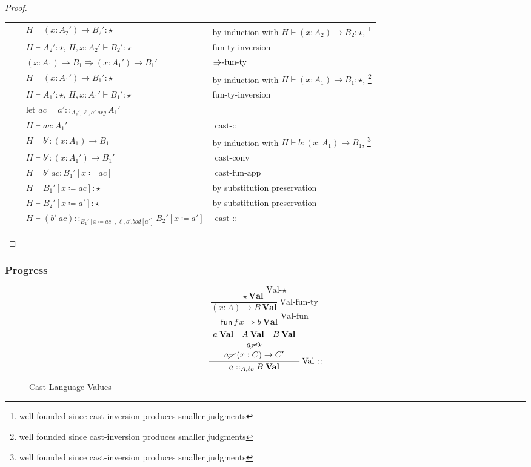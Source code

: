 \begin{proof}
\begin{tabular}{llll}
 &  & $H\vdash\left(x:A_{2}'\right)\rightarrow B_{2}':\star$ & by induction with $H\vdash\left(x:A_{2}\right)\rightarrow B_{2}:\star$,
\footnote{well founded since cast-inversion produces smaller judgments}\tabularnewline
 &  & $H\vdash A_{2}':\star$, $H,x:A_{2}'\vdash B_{2}':\star$ & fun-ty-inversion\tabularnewline
 &  & $\left(x:A_{1}\right)\rightarrow B_{1}\Rrightarrow\left(x:A_{1}'\right)\rightarrow B_{1}'$ & $\textrm{\ensuremath{\Rrightarrow}-fun-ty}$\tabularnewline
 &  & $H\vdash\left(x:A_{1}'\right)\rightarrow B_{1}':\star$ & by induction with $H\vdash\left(x:A_{1}\right)\rightarrow B_{1}:\star$,
\footnote{well founded since cast-inversion produces smaller judgments}\tabularnewline
 &  & $H\vdash A_{1}':\star$, $H,x:A_{1}'\vdash B_{1}':\star$ & fun-ty-inversion\tabularnewline
 &  & let $ac=a'::_{A_{2}',\ell,o'.arg}A_{1}'$ & \tabularnewline
 &  & $H\vdash ac:A_{1}'$ & $\operatorname{cast-::}$\tabularnewline
 &  & $H\vdash b':\left(x:A_{1}\right)\rightarrow B_{1}$ & by induction with $H\vdash b:\left(x:A_{1}\right)\rightarrow B_{1}$,
\footnote{well founded since cast-inversion produces smaller judgments}\tabularnewline
 &  & $H\vdash b':\left(x:A_{1}'\right)\rightarrow B_{1}'$ & $\operatorname{cast-conv}$\tabularnewline
 &  & $H\vdash b'\ ac:B_{1}'\left[x\coloneqq ac\right]$ & $\operatorname{cast-fun-app}$\tabularnewline
 &  & $H\vdash B_{1}'\left[x\coloneqq ac\right]:\star$ & by substitution preservation\tabularnewline
 &  & $H\vdash B_{2}'\left[x\coloneqq a'\right]:\star$ & by substitution preservation\tabularnewline
 &  & $H\vdash\left(b'\ ac\right)::_{B_{1}'\left[x\coloneqq ac\right],\ensuremath{\ell},o'.bod[a']}B_{2}'\left[x\coloneqq a'\right]$ & $\operatorname{cast-::}$\tabularnewline
\end{tabular}
\end{proof}


\subsubsection{Progress}

\begin{figure}
\[
\frac{\,}{\star\,\textbf{Val}}\operatorname{Val-\star}
\]
\[
\frac{\,}{\left(x:A\right)\rightarrow B\,\textbf{Val}}\operatorname{Val-fun-ty}
\]
\[
\frac{\,}{\mathsf{fun}\,f\,x\Rightarrow b\:\textbf{Val}}\operatorname{Val-fun}
\]
\[
\frac{\begin{array}{c}
a\:\textbf{Val}\quad A\:\textbf{Val}\quad B\:\textbf{Val}\\
a\cancel{=}\star\\
a\cancel{=}\left(x:C\right)\rightarrow C'
\end{array}}{a::_{A,\ensuremath{\ell}o}B\:\textbf{Val}}\operatorname{Val-::}
\]
\caption{Cast Language Values}
\label{fig:cast-val}
\end{figure}

